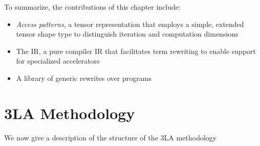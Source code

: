   To summarize, the contributions of this chapter include:
\begin{itemize}
\item \textit{Access patterns},
  a tensor representation that employs a
  simple, extended tensor shape type to
  distinguish iteration and computation dimensions

\item The \g IR,
  a pure compiler IR that facilitates 
  term rewriting to enable support for
  specialized accelerators
  
\item A library of generic rewrites over \g programs
  
\end{itemize}


\section{3LA Methodology}


We now give a description
  of the structure
  of the 3LA methodology
